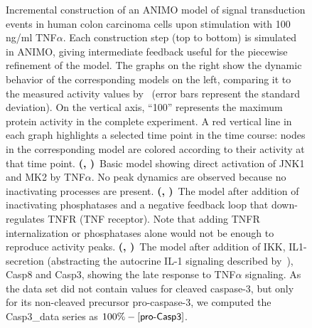 \begin{figure}[!bhtp]
\begin{tabular}{ll}
\end{tabular}
  \caption{
Incremental construction of an ANIMO model of signal transduction
events in human colon carcinoma cells upon stimulation with 100 ng/ml TNF$\alpha$.
Each construction step (top to bottom) is simulated in ANIMO, giving intermediate feedback
useful for the piecewise refinement of the model.
The graphs on the right show the dynamic behavior of the corresponding models on the left, comparing it to the measured
activity values by~\cite{pathway-compendium} (error bars represent the standard deviation).
On the vertical axis, ``100'' represents the maximum protein activity in the complete experiment.
A red vertical line in each graph highlights a selected time point in the time course:
nodes in the corresponding model are colored according to their activity at that time point.
{\bf (\protect{}, \protect{})}~Basic model showing direct activation of JNK1 and MK2 by TNF$\alpha$.
No peak dynamics are observed because no inactivating processes are present.
{\bf (\protect{}, \protect{})}~The model after addition of inactivating phosphatases and a
negative feedback loop that down-regulates TNFR (TNF receptor). Note that adding TNFR internalization or phosphatases alone would not be enough to reproduce activity peaks.
{\bf (\protect{}, \protect{})}~The model after addition of IKK, IL1-secretion (abstracting
the autocrine IL-1 signaling described by~\citealp{pathway-autocrine}), Casp8 and Casp3, showing the late response to TNF$\alpha$ signaling.
As the data set did not contain values for cleaved caspase-3, but only for its non-cleaved precursor pro-caspase-3,
we computed the {\sf Casp3\_{}data} series as $100\% - [\mbox{\sf pro-Casp3}]$.}\label{fig:small-model}
\end{figure}